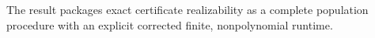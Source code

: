 The result packages exact certificate realizability as a complete population procedure with an explicit corrected finite, nonpolynomial runtime.